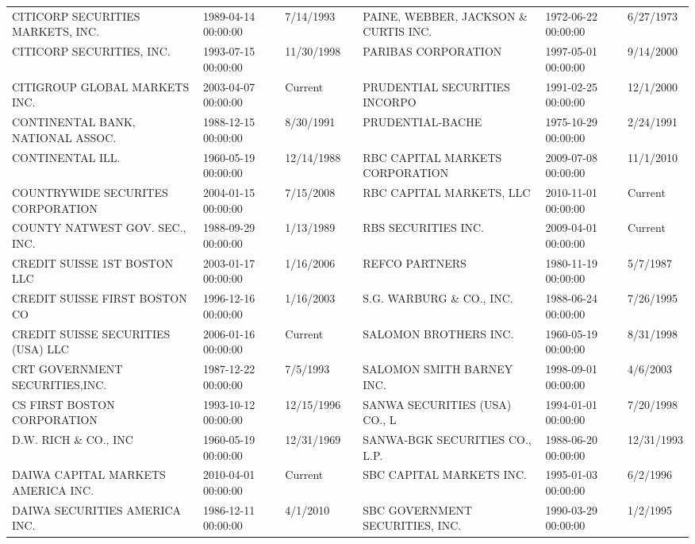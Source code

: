 \documentclass{article}
\begin{document}
\begin{tabular}{lllllll}
CITICORP SECURITIES MARKETS, INC.    & 1989-04-14 00:00:00 & 7/14/1993 &  & PAINE, WEBBER, JACKSON \& CURTIS INC. & 1972-06-22 00:00:00 & 6/27/1973 \\
CITICORP SECURITIES, INC.            & 1993-07-15 00:00:00 & 11/30/1998 &  & PARIBAS CORPORATION                  & 1997-05-01 00:00:00 & 9/14/2000 \\
CITIGROUP GLOBAL MARKETS INC.   & 2003-04-07 00:00:00 & Current &  & PRUDENTIAL SECURITIES INCORPO   & 1991-02-25 00:00:00 & 12/1/2000 \\
CONTINENTAL BANK, NATIONAL ASSOC.    & 1988-12-15 00:00:00 & 8/30/1991 &  & PRUDENTIAL-BACHE                & 1975-10-29 00:00:00 & 2/24/1991 \\
CONTINENTAL ILL.                     & 1960-05-19 00:00:00 & 12/14/1988 &  & RBC CAPITAL MARKETS CORPORATION & 2009-07-08 00:00:00 & 11/1/2010 \\
COUNTRYWIDE SECURITES CORPORATION & 2004-01-15 00:00:00 & 7/15/2008 &  & RBC CAPITAL MARKETS, LLC & 2010-11-01 00:00:00 & Current \\
COUNTY NATWEST GOV. SEC., INC.       & 1988-09-29 00:00:00 & 1/13/1989 &  & RBS SECURITIES INC. & 2009-04-01 00:00:00 & Current \\
CREDIT SUISSE 1ST BOSTON LLC    & 2003-01-17 00:00:00 & 1/16/2006 &  & REFCO PARTNERS                      & 1980-11-19 00:00:00 & 5/7/1987 \\
CREDIT SUISSE FIRST BOSTON CO       & 1996-12-16 00:00:00 & 1/16/2003 &  & S.G. WARBURG \& CO., INC.             & 1988-06-24 00:00:00 & 7/26/1995 \\
CREDIT SUISSE SECURITIES (USA) LLC & 2006-01-16 00:00:00 & Current &  & SALOMON BROTHERS INC.               & 1960-05-19 00:00:00 & 8/31/1998 \\
CRT GOVERNMENT SECURITIES,INC.      & 1987-12-22 00:00:00 & 7/5/1993 &  & SALOMON SMITH BARNEY INC.       & 1998-09-01 00:00:00 & 4/6/2003 \\
CS FIRST BOSTON CORPORATION         & 1993-10-12 00:00:00 & 12/15/1996 &  & SANWA SECURITIES (USA) CO., L       & 1994-01-01 00:00:00 & 7/20/1998 \\
D.W. RICH \& CO., INC                 & 1960-05-19 00:00:00 & 12/31/1969 &  & SANWA-BGK SECURITIES CO., L.P.      & 1988-06-20 00:00:00 & 12/31/1993 \\
DAIWA CAPITAL MARKETS AMERICA INC. & 2010-04-01 00:00:00 & Current &  & SBC CAPITAL MARKETS INC.        & 1995-01-03 00:00:00 & 6/2/1996 \\
DAIWA SECURITIES AMERICA INC.       & 1986-12-11 00:00:00 & 4/1/2010 &  & SBC GOVERNMENT SECURITIES, INC. & 1990-03-29 00:00:00 & 1/2/1995 \\

\end{tabular}
\end{document}
